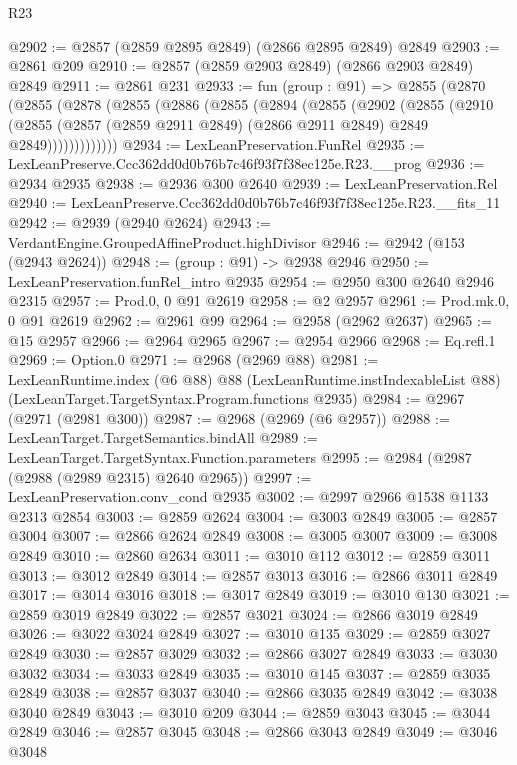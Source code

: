 \begin{lexlean}{R23}
\begin{coremodule}
@2902 := @2857 (@2859 @2895 @2849) (@2866 @2895 @2849) @2849
@2903 := @2861 @209
@2910 := @2857 (@2859 @2903 @2849) (@2866 @2903 @2849) @2849
@2911 := @2861 @231
@2933 := fun (group : @91) =>
  @2855
    (@2870
      (@2855
        (@2878
          (@2855
            (@2886
              (@2855
                (@2894
                  (@2855
                    (@2902
                      (@2855
                        (@2910
                          (@2855
                            (@2857 (@2859 @2911 @2849) (@2866 @2911 @2849) @2849 @2849)))))))))))))
@2934 := LexLeanPreservation.FunRel
@2935 := LexLeanPreserve.Ccc362dd0d0b76b7c46f93f7f38ec125e.R23.__prog
@2936 := @2934 @2935
@2938 := @2936 @300 @2640
@2939 := LexLeanPreservation.Rel
@2940 := LexLeanPreserve.Ccc362dd0d0b76b7c46f93f7f38ec125e.R23.__fits_11
@2942 := @2939 (@2940 @2624)
@2943 := VerdantEngine.GroupedAffineProduct.highDivisor
@2946 := @2942 (@153 (@2943 @2624))
@2948 := (group : @91) -> @2938 @2946
@2950 := LexLeanPreservation.funRel_intro @2935
@2954 := @2950 @300 @2640 @2946 @2315
@2957 := Prod.{0, 0} @91 @2619
@2958 := @2 @2957
@2961 := Prod.mk.{0, 0} @91 @2619
@2962 := @2961 @99
@2964 := @2958 (@2962 @2637)
@2965 := @15 @2957
@2966 := @2964 @2965
@2967 := @2954 @2966
@2968 := Eq.refl.{1}
@2969 := Option.{0}
@2971 := @2968 (@2969 @88)
@2981 := LexLeanRuntime.index
    (@6 @88)
    @88
    (LexLeanRuntime.instIndexableList @88)
    (LexLeanTarget.TargetSyntax.Program.functions @2935)
@2984 := @2967 (@2971 (@2981 @300))
@2987 := @2968 (@2969 (@6 @2957))
@2988 := LexLeanTarget.TargetSemantics.bindAll
@2989 := LexLeanTarget.TargetSyntax.Function.parameters
@2995 := @2984 (@2987 (@2988 (@2989 @2315) @2640 @2965))
@2997 := LexLeanPreservation.conv_cond @2935
@3002 := @2997 @2966 @1538 @1133 @2313 @2854
@3003 := @2859 @2624
@3004 := @3003 @2849
@3005 := @2857 @3004
@3007 := @2866 @2624 @2849
@3008 := @3005 @3007
@3009 := @3008 @2849
@3010 := @2860 @2634
@3011 := @3010 @112
@3012 := @2859 @3011
@3013 := @3012 @2849
@3014 := @2857 @3013
@3016 := @2866 @3011 @2849
@3017 := @3014 @3016
@3018 := @3017 @2849
@3019 := @3010 @130
@3021 := @2859 @3019 @2849
@3022 := @2857 @3021
@3024 := @2866 @3019 @2849
@3026 := @3022 @3024 @2849
@3027 := @3010 @135
@3029 := @2859 @3027 @2849
@3030 := @2857 @3029
@3032 := @2866 @3027 @2849
@3033 := @3030 @3032
@3034 := @3033 @2849
@3035 := @3010 @145
@3037 := @2859 @3035 @2849
@3038 := @2857 @3037
@3040 := @2866 @3035 @2849
@3042 := @3038 @3040 @2849
@3043 := @3010 @209
@3044 := @2859 @3043
@3045 := @3044 @2849
@3046 := @2857 @3045
@3048 := @2866 @3043 @2849
@3049 := @3046 @3048

\end{coremodule}
\end{lexlean}
